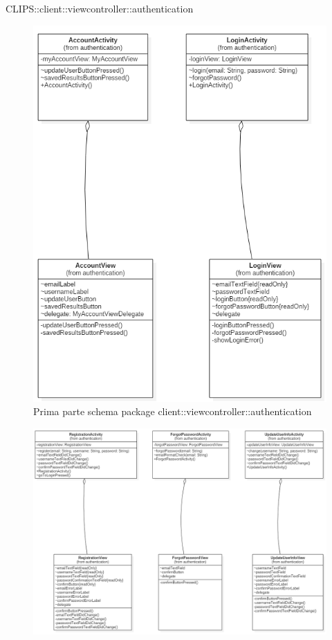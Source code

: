 \begin{componente}{CLIPS::client::viewcontroller::authentication}
	\begin{figure}[h!]
		\centering
		\includegraphics[scale=0.4]{img/package/png/client--viewcontroller--authentication1.png}
		\caption{Prima parte schema package client::viewcontroller::authentication}
	\end{figure}
	\begin{figure}[h!]
		\centering
		\includegraphics[scale=0.4]{img/package/png/client--viewcontroller--authentication2.png}

\end{figure}
\end{componente}
